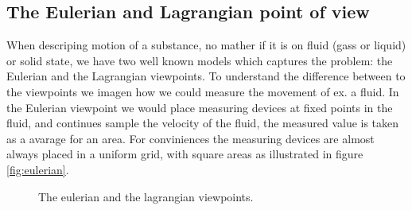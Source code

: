 
\subsection{The Eulerian and Lagrangian point of view}

When descriping motion of a substance, no mather if it is on fluid
(gass or liquid) or solid state, we have two well known models
which captures the problem: the Eulerian and the Lagrangian
viewpoints. To understand the difference between to the viewpoints we
imagen how we could measure the movement of ex. a fluid. In the Eulerian
viewpoint we would place measuring devices at fixed points in the
fluid, and continues sample the velocity of the fluid, the measured
value is taken as a avarage for an area. For conviniences the
measuring devices are almost always placed in a uniform grid, with
square areas as illustrated in figure \ref{fig:eulerian}.

\begin{figure}[h]
  \centering
  \caption{The eulerian and the lagrangian viewpoints.}
  \label{fig:eulerian-lagrangian}
\end{figure}

